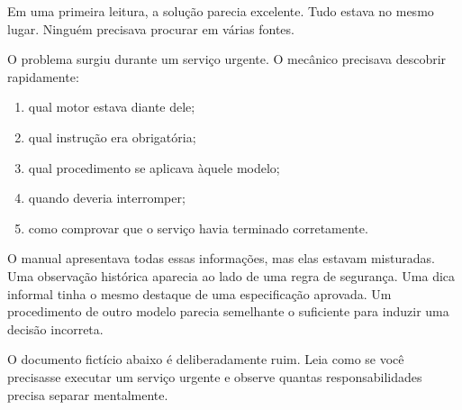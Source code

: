 \documentclass[
  10pt,
  a4paper,
  oneside]{book}
\providecommand{\tightlist}{%
  \setlength{\itemsep}{0pt}\setlength{\parskip}{0pt}}
\begin{document}
Em uma primeira leitura, a solução parecia excelente. Tudo estava no
mesmo lugar. Ninguém precisava procurar em várias fontes.

O problema surgiu durante um serviço urgente. O mecânico precisava
descobrir rapidamente:

\begin{enumerate}
\def\labelenumi{\arabic{enumi}.}
\tightlist
\item
  qual motor estava diante dele;
\item
  qual instrução era obrigatória;
\item
  qual procedimento se aplicava àquele modelo;
\item
  quando deveria interromper;
\item
  como comprovar que o serviço havia terminado corretamente.
\end{enumerate}

O manual apresentava todas essas informações, mas elas estavam
misturadas. Uma observação histórica aparecia ao lado de uma regra de
segurança. Uma dica informal tinha o mesmo destaque de uma especificação
aprovada. Um procedimento de outro modelo parecia semelhante o
suficiente para induzir uma decisão incorreta.

O documento fictício abaixo é deliberadamente ruim. Leia como se você
precisasse executar um serviço urgente e observe quantas
responsabilidades precisa separar mentalmente.
\end{document}
